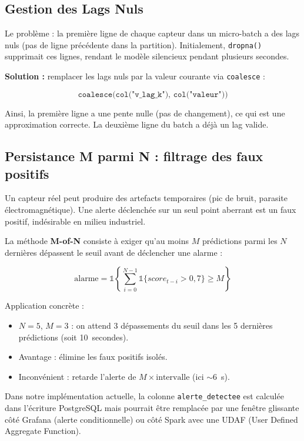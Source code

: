 \documentclass[11pt,a4paper]{article}
\begin{document}
\subsection{Gestion des Lags Nuls}

Le problème : la première ligne de chaque capteur dans un micro-batch a des lags nuls (pas de ligne précédente dans la partition). Initialement, \texttt{dropna()} supprimait ces lignes, rendant le modèle silencieux pendant plusieurs secondes.

\textbf{Solution :} remplacer les lags nuls par la valeur courante via \texttt{coalesce} :

\[
\texttt{coalesce(col("v\_lag\_k"), col("valeur"))}
\]

Ainsi, la première ligne a une pente nulle (pas de changement), ce qui est une approximation correcte. La deuxième ligne du batch a déjà un lag valide.

\subsection{Persistance M parmi N : filtrage des faux positifs}

Un capteur réel peut produire des artefacts temporaires (pic de bruit, parasite électromagnétique). Une alerte déclenchée sur un seul point aberrant est un faux positif, indésirable en milieu industriel.

La méthode \textbf{M-of-N} consiste à exiger qu'au moins $M$ prédictions parmi les $N$ dernières dépassent le seuil avant de déclencher une alarme :

\[
\text{alarme} = \mathbb{1}\left\{\sum_{i=0}^{N-1} \mathbb{1}\{score_{t-i} > 0,7\} \geq M\right\}
\]

Application concrète :
\begin{itemize}
    \item $N = 5$, $M = 3$ : on attend 3 dépassements du seuil dans les 5 dernières prédictions (soit 10~secondes).
    \item Avantage : élimine les faux positifs isolés.
    \item Inconvénient : retarde l'alerte de $M \times \text{intervalle}$ (ici $\sim$6~s).
\end{itemize}

Dans notre implémentation actuelle, la colonne \texttt{alerte\_detectee} est calculée dans l'écriture PostgreSQL mais pourrait être remplacée par une fenêtre glissante côté Grafana (alerte conditionnelle) ou côté Spark avec une UDAF (User Defined Aggregate Function).
\end{document}
